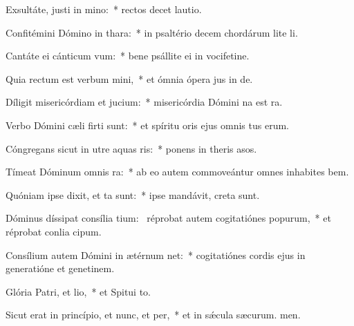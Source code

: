 \item Exsultáte, justi in mino:~* rectos decet lautio.
\item Confitémini Dómino in thara:~* in psaltério decem chordárum lite li.
\item Cantáte ei cánticum vum:~* bene psállite ei in vocifetine.
\item Quia rectum est verbum mini,~* et ómnia ópera jus in de.
\item Díligit misericórdiam et jucium:~* misericórdia Dómini na est ra.
\item Verbo Dómini cæli firti sunt:~* et spíritu oris ejus omnis tus erum.
\item Cóngregans sicut in utre aquas ris:~* ponens in theris asos.
\item Tímeat Dóminum omnis ra:~* ab eo autem commoveántur omnes inhabites bem.
\item Quóniam ipse dixit, et ta sunt:~* ipse mandávit,  creta sunt.
\item Dóminus díssipat consília tium:~\pscross{} réprobat autem cogitatiónes popurum,~* et réprobat conlia cipum.
\item Consílium autem Dómini in ætérnum net:~* cogitatiónes cordis ejus in generatióne et genetinem.
\item Glória Patri, et lio,~* et Spitui to.
\item Sicut erat in princípio, et nunc, et per,~* et in sǽcula sæcurum. men.
